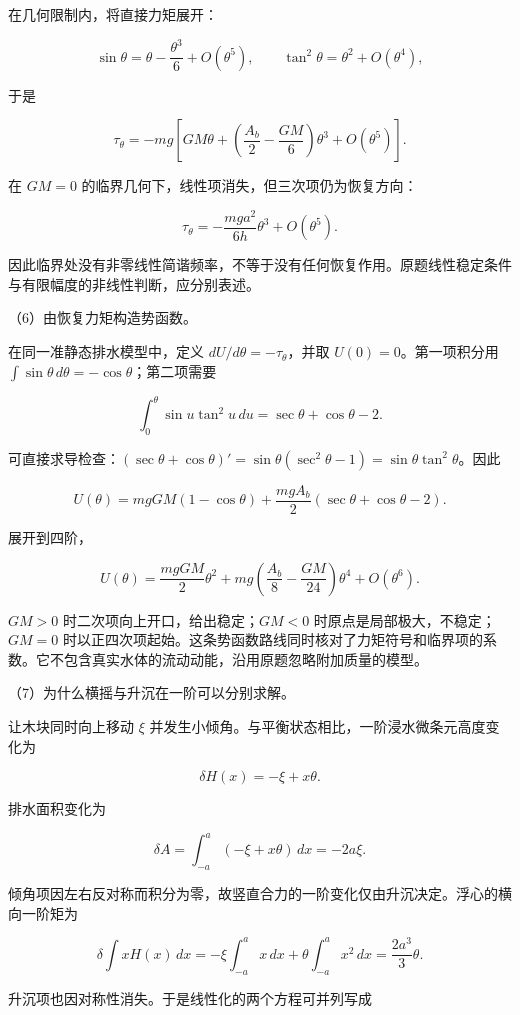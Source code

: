 \documentclass[12pt,a4paper,fontset=fandol]{ctexart}
\begin{document}
在几何限制内，将直接力矩展开：

\[
\sin\theta=\theta-\frac{\theta^3}{6}+O(\theta^5),\qquad
\tan^2\theta=\theta^2+O(\theta^4),
\]

于是

\[
\tau_\theta=-mg\left[
GM\theta+\left(\frac{A_b}{2}-\frac{GM}{6}\right)\theta^3
+O(\theta^5)\right].
\]

在 \(GM=0\) 的临界几何下，线性项消失，但三次项仍为恢复方向：

\[
\tau_\theta=-\frac{mga^2}{6h}\theta^3+O(\theta^5).
\]

因此临界处没有非零线性简谐频率，不等于没有任何恢复作用。原题线性稳定条件与有限幅度的非线性判断，应分别表述。

（6）由恢复力矩构造势函数。

在同一准静态排水模型中，定义 \(dU/d\theta=-\tau_\theta\)，并取
\(U(0)=0\)。第一项积分用
\(\int\sin\theta\,d\theta=-\cos\theta\)；第二项需要

\[
\int_0^\theta\sin u\tan^2u\,du
=\sec\theta+\cos\theta-2.
\]

可直接求导检查：\((\sec\theta+\cos\theta)'=\sin\theta(\sec^2\theta-1)=\sin\theta\tan^2\theta\)。因此

\[
U(\theta)=mgGM(1-\cos\theta)
+\frac{mgA_b}{2}(\sec\theta+\cos\theta-2).
\]

展开到四阶，

\[
U(\theta)=\frac{mgGM}{2}\theta^2
+mg\left(\frac{A_b}{8}-\frac{GM}{24}\right)\theta^4
+O(\theta^6).
\]

\(GM>0\) 时二次项向上开口，给出稳定；\(GM<0\)
时原点是局部极大，不稳定；\(GM=0\)
时以正四次项起始。这条势函数路线同时核对了力矩符号和临界项的系数。它不包含真实水体的流动动能，沿用原题忽略附加质量的模型。

（7）为什么横摇与升沉在一阶可以分别求解。

让木块同时向上移动 \(\xi\)
并发生小倾角。与平衡状态相比，一阶浸水微条元高度变化为

\[
\delta H(x)=-\xi+x\theta.
\]

排水面积变化为

\[
\delta A=\int_{-a}^a(-\xi+x\theta)\,dx=-2a\xi.
\]

倾角项因左右反对称而积分为零，故竖直合力的一阶变化仅由升沉决定。浮心的横向一阶矩为

\[
\delta\int xH(x)\,dx
=-\xi\int_{-a}^a x\,dx+\theta\int_{-a}^a x^2\,dx
=\frac{2a^3}{3}\theta.
\]

升沉项也因对称性消失。于是线性化的两个方程可并列写成
\end{document}
